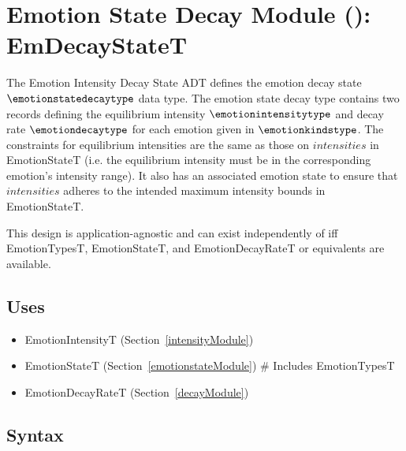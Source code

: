 \section{Emotion State Decay Module ():
EmDecayStateT}\label{decayStateModule}

The Emotion Intensity Decay State ADT defines the emotion decay state
$\emotionstatedecaytype$ data type. The emotion state decay type contains two
records defining the equilibrium intensity $\emotionintensitytype$ and decay
rate $\emotiondecaytype$ for each emotion given in $\emotionkindstype$. The
constraints for equilibrium intensities are the same as those on
$\mathit{intensities}$ in EmotionStateT (i.e. the equilibrium intensity must be
in the corresponding emotion's intensity range). It also has an associated
emotion state to ensure that $\mathit{intensities}$ adheres to the intended
maximum intensity bounds in EmotionStateT.

This design is application-agnostic and can exist independently of \progname{}
iff EmotionTypesT, EmotionStateT, and EmotionDecayRateT or equivalents are
available.

\subsection{Uses}
\begin{itemize}[noitemsep, nosep]

    \item EmotionIntensityT (Section~\ref{intensityModule})

    \item EmotionStateT (Section~\ref{emotionstateModule}) \# Includes
    EmotionTypesT

    \item EmotionDecayRateT (Section~\ref{decayModule})

\end{itemize}

\subsection{Syntax}

